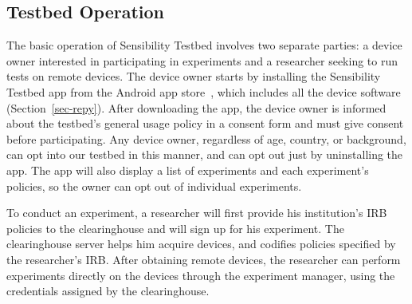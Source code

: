\subsection{Testbed Operation}


The basic operation of Sensibility Testbed involves two separate 
parties: a device owner interested in participating in experiments 
and a researcher seeking to run tests on remote devices. The 
device owner starts by installing the Sensibility Testbed app from 
the Android app store~\cite{sensibility-app}, which includes all the 
device software (Section~\ref{sec-repy}). After downloading the app, 
the device owner is informed about the testbed's general usage policy 
in a consent form and must give consent before participating.
Any device owner, regardless of age, country, or background, can 
opt into our testbed in this manner, and can opt out just by uninstalling 
the app. The app will also display a list of experiments and each 
experiment's policies, so the owner can opt out of individual experiments. 

To conduct an experiment, a researcher will first provide his institution's 
IRB policies to the clearinghouse and will sign up for his experiment.  
The clearinghouse server helps him acquire devices, and codifies 
policies specified by the researcher's IRB. After obtaining remote devices, 
the researcher can perform experiments directly on the devices through 
the experiment manager, using the credentials assigned by the clearinghouse. 





